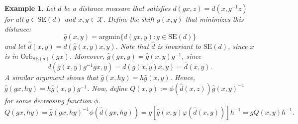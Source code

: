\documentclass{article}
\newtheorem{example}{Example}
\newcommand{\euclid}[1]{\mathrm{SE}(#1)}
\newcommand{\xspace}{\mathcal{X}}
\begin{document}
    \begin{example} Let $d$ be a distance measure that satisfies $d(gx,z)=d(x,g^{-1}z)$ for all $g\in\euclid{d}$ and $x,y\in \xspace$. Define the shift $g(x,y)$ that minimizes this distance:
    \[
        \widehat g(x,y) = \mathrm{argmin}\{d(gx, y)\colon g\in \euclid{d}\}
    \]
    and let $\widehat d(x,y)=d(\widehat g(x,y)x,y)$. Note that $\widehat d$ is invariant to $\euclid{d}$, since $x$ is in $\mathrm{Orb}_{\euclid{d}}(gx)$. Moreover, $\widehat{g}(gx,y)=\widehat{g}(x,y)g^{-1}$, since
    \[
        d(g(x,y)g^{-1}gx, y) = d(g(x,y)x,y)=\widehat{d}(x,y).
    \]
    A similar argument shows that $\widehat g(x,hy)=h\widehat g (x, y)$. Hence, $\widehat g(gx, hy)=h\widehat g(x,y) g^{-1}$. Now, define $Q(x,y):=\phi(\widehat d(x,z))\widehat g(x,y)^{-1}$ for some decreasing function $\phi$.
    \[
        Q(gx,hy) = \widehat g(gx, hy)^{-1}\phi(\widehat d(gx, hy)) = g\left[\widehat{g}(x, y)\varphi(\widehat{d}(x,y))\right]h^{-1} = gQ(x,y)h^{-1}.
    \]
    \end{example}
    
\end{document}
